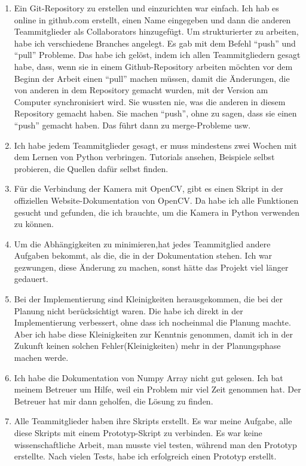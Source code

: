\begin{itemize}
\begin{enumerate}
	\item Ein Git-Repository zu erstellen und einzurichten war einfach. Ich hab es online in github.com erstellt, einen Name eingegeben und dann die anderen Teammitglieder als Collaborators hinzugef\"ugt. Um strukturierter zu arbeiten, habe ich verschiedene Branches angelegt. Es gab mit dem Befehl ``push'' und ``pull'' Probleme. Das habe ich gel\"ost, indem ich allen Teammitgliedern gesagt habe, dass, wenn sie in einem Github-Repository arbeiten m\"ochten vor dem Beginn der Arbeit einen ``pull'' machen m\"ussen, damit die \"Anderungen, die von anderen in dem Repository gemacht wurden, mit der Version am Computer synchronisiert wird. Sie wussten nie, was die anderen in diesem Repository gemacht haben. Sie machen ``push'', ohne zu sagen, dass sie einen ``push'' gemacht haben. Das f\"uhrt dann zu merge-Probleme usw. 
	
	\item Ich habe jedem Teammitglieder gesagt, er muss mindestens zwei Wochen mit dem Lernen von Python verbringen. Tutorials ansehen, Beispiele selbst probieren, die Quellen daf\"ur selbst finden. 
	
	\item  F\"ur die Verbindung der Kamera mit OpenCV, gibt es einen Skript in der offiziellen Website-Dokumentation von OpenCV. Da habe ich alle Funktionen gesucht und gefunden, die ich brauchte, um die Kamera in Python verwenden zu k\"onnen. 
	
	\item Um die Abh\"angigkeiten zu minimieren,hat jedes Teammitglied andere Aufgaben bekommt, als die, die in der Dokumentation stehen. Ich war gezwungen, diese \"Anderung zu machen, sonst h\"atte das Projekt viel l\"anger gedauert. 
	
	\item Bei der Implementierung sind Kleinigkeiten herausgekommen, die bei der Planung nicht ber\"ucksichtigt waren. Die habe ich direkt in der Implementierung verbessert, ohne dass ich nocheinmal die Planung machte. Aber ich habe diese Kleinigkeiten zur Kenntnis genommen, damit ich in der Zukunft keinen solchen Fehler(Kleinigkeiten) mehr in der Planungsphase machen werde. 
	
	\item Ich habe die Dokumentation von Numpy Array nicht gut gelesen. Ich bat meinem Betreuer um Hilfe, weil ein Problem mir viel Zeit genommen hat. Der Betreuer hat mir dann geholfen, die L\"osung zu finden. 
	
	\item Alle Teammitglieder haben ihre Skripts erstellt. Es war meine Aufgabe, alle diese Skripts mit einem Prototyp-Skript zu verbinden. Es war keine wissenschaftliche Arbeit, man musste viel testen, w\"ahrend man den Prototyp erstellte. Nach vielen Tests, habe ich erfolgreich einen Prototyp erstellt.
	

\end{enumerate}
\end{itemize}
